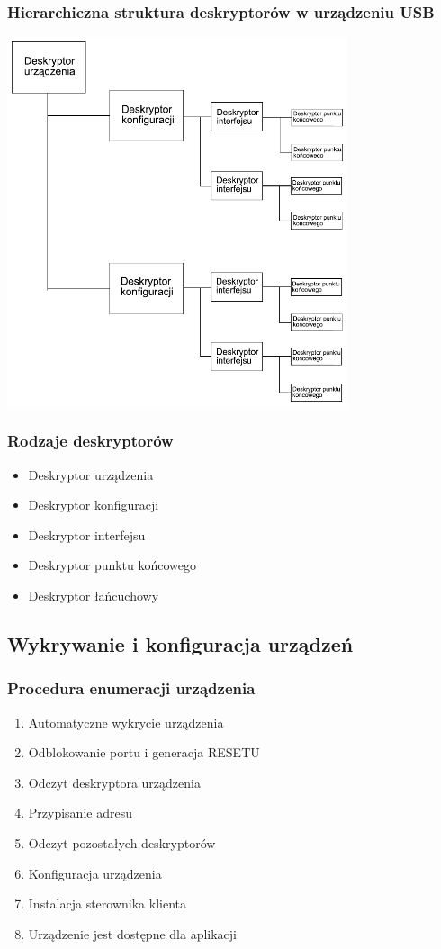 \documentclass[a4paper,twoside]{article}
\begin{document}
	\subsubsection{Hierarchiczna struktura deskryptorów w urządzeniu USB}
	\includegraphics[width=10cm]{./wyklady/USB_24_1.pdf}
	\subsubsection{Rodzaje deskryptorów}
	\begin{itemize}
		\item Deskryptor urządzenia
		\item Deskryptor konfiguracji
		\item Deskryptor interfejsu
		\item Deskryptor punktu końcowego
		\item Deskryptor łańcuchowy
	\end{itemize}
	
\subsection{Wykrywanie i konfiguracja urządzeń}
	\subsubsection{Procedura enumeracji urządzenia}
	\begin{enumerate}
		\item Automatyczne wykrycie urządzenia
		\item Odblokowanie portu i generacja RESETU
		\item Odczyt deskryptora urządzenia
		\item Przypisanie adresu
		\item Odczyt pozostałych deskryptorów
		\item Konfiguracja urządzenia
		\item Instalacja sterownika klienta
		\item Urządzenie jest dostępne dla aplikacji
	\end{enumerate}
	
\end{document}
